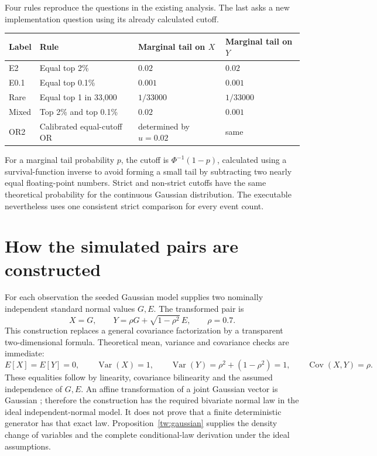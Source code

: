 Four rules reproduce the questions in the existing analysis. The last asks a
new implementation question using its already calculated cutoff.
\begin{center}
\begin{tabular}{llll}
\toprule
Label & Rule & Marginal tail on \(X\) & Marginal tail on \(Y\)\\
\midrule
E2 & Equal top 2\% & \(0.02\) & \(0.02\)\\
E0.1 & Equal top 0.1\% & \(0.001\) & \(0.001\)\\
Rare & Equal top 1 in 33,000 & \(1/33000\) & \(1/33000\)\\
Mixed & Top 2\% and top 0.1\% & \(0.02\) & \(0.001\)\\
OR2 & Calibrated equal-cutoff OR & determined by \(u=0.02\) & same\\
\bottomrule
\end{tabular}
\end{center}
For a marginal tail probability \(p\), the cutoff is
\(\Phi^{-1}(1-p)\), calculated using a survival-function inverse to avoid
forming a small tail by subtracting two nearly equal floating-point numbers.
Strict and non-strict cutoffs have the same theoretical probability for the
continuous Gaussian distribution. The executable nevertheless uses one
consistent strict comparison for every event count.

\chapter{How the simulated pairs are constructed}

For each observation the seeded Gaussian model supplies two nominally independent
standard normal values \(G,E\). The transformed pair is
\begin{equation}
 X=G,\qquad Y=\rho G+\sqrt{1-\rho^2}\,E,\qquad \rho=0.7.
 \label{eq:towers-generator}
\end{equation}
This construction replaces a general covariance factorization by a transparent
two-dimensional formula. Theoretical mean, variance and covariance checks are
immediate:
\[
 E[X]=E[Y]=0,\qquad \operatorname{Var}(X)=1,
 \qquad \operatorname{Var}(Y)=\rho^2+(1-\rho^2)=1,
 \qquad \operatorname{Cov}(X,Y)=\rho.
\]
These equalities follow by linearity, covariance bilinearity and the assumed
independence of \(G,E\). An affine transformation of a joint Gaussian vector
is Gaussian \citep[Chapter 3]{gallager2013}; therefore the construction has
the required bivariate normal law in the ideal independent-normal model.
It does not prove that a finite deterministic generator has that exact law.
Proposition~\ref{tw:gaussian} supplies the density change of variables and
the complete conditional-law derivation under the ideal assumptions.

